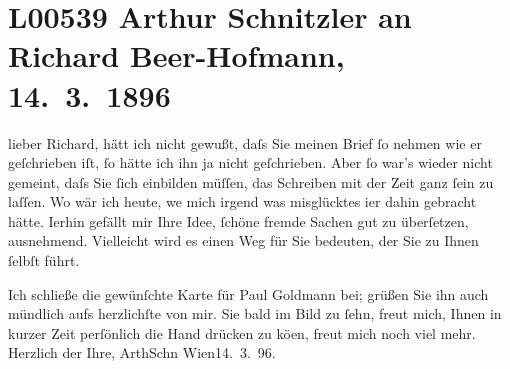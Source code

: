 

\section[Arthur Schnitzler an Richard Beer-Hofmann, 14. 3. 1896]{L00539 Arthur Schnitzler an Richard Beer-Hofmann, 14. 3. 1896}
\nopagebreak{}
\rehead{ }\normalsize\beginnumbering{}
\toendnotes[C]{\smallbreak\pagebreak[2]}
\toendnotes[C]{\smallbreak}
\pstart
           \noindent{}{\pb}lieber Richard, hätt ich nicht gewußt, daſs Sie meinen Brief{ }ſo
               nehmen wie er geſchrieben iſt,{ }ſo hätte ich ihn ja nicht geſchrieben. Aber{ }ſo war’s
               wieder nicht gemeint, daſs Sie{ }ſich einbilden \introOben{}müſſen\introOben{}, das
               Schreiben mit der Zeit ganz{ }ſein zu laſſen. Wo wär ich heute, we{\geminationn} mich irgend was misglücktes i{\geminationm}er dahin gebracht hätte. I{\geminationm}erhin gefällt mir Ihre Idee,{ }ſchöne fremde Sachen gut zu überſetzen, ausnehmend.
               Vielleicht wird es einen Weg für Sie bedeuten, der Sie zu Ihnen{ }ſelbſt führt.\pend
           
\pstart
           {\pb}Ich schließe die gewünſchte Karte für Paul Goldmann bei; grüßen Sie ihn auch mündlich
               aufs herzlichſte von mir. Sie bald im Bild zu{ }ſehn, freut mich, Ihnen in kurzer Zeit
               perſönlich die Hand drücken zu kö{\geminationn}en, freut mich noch
               viel mehr.\pend
           \pstart Herzlich der Ihre, \spacefill\mbox{ArthSchn}\pend{}
\pstart
           Wien14. 3. 96.\pend
           \endnumbering{}  \newcommand{\dateiname}{L00539}\newcommand{\titel}{Arthur Schnitzler an Richard Beer-Hofmann, 14. 3. 1896}\newcommand{\editorInnen}{Martin Anton Müller und Gerd-Hermann Susen}
